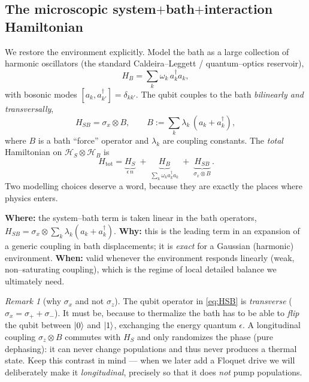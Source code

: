 \documentclass[11pt,a4paper]{article}
\newcommand{\calH}{\mathcal{H}}
\theoremstyle{definition}
\theoremstyle{remark}
\newtheorem{remark}{Remark}[section]
\begin{document}
\subsection{The microscopic system$+$bath$+$interaction Hamiltonian}
We restore the environment explicitly. Model the bath as a large
collection of harmonic oscillators (the standard Caldeira--Leggett /
quantum--optics reservoir),
\begin{equation}
H_B = \sum_k \omega_k\, a_k^\dagger a_k ,
\label{eq:HB}
\end{equation}
with bosonic modes $[a_k,a_{k'}^\dagger]=\delta_{kk'}$. The qubit couples
to the bath \emph{bilinearly and transversally},
\begin{equation}
H_{SB} = \sigma_x \otimes B, \qquad
B := \sum_k \lambda_k\,(a_k + a_k^\dagger),
\label{eq:HSB}
\end{equation}
where $B$ is a bath ``force'' operator and $\lambda_k$ are coupling
constants. The \emph{total} Hamiltonian on $\calH_S\otimes\calH_B$ is
\begin{equation}
\boxed{\,H_{\mathrm{tot}} = \underbrace{H_S}_{\epsilon\, n}
\;+\; \underbrace{H_B}_{\sum_k\omega_k a_k^\dagger a_k}
\;+\; \underbrace{H_{SB}}_{\sigma_x\otimes B}\, .}
\label{eq:Htot-open}
\end{equation}
Two modelling choices deserve a word, because they are exactly the
places where physics enters.

\begin{approxbox}
\textbf{Where:} the system--bath term is taken linear in the bath
operators, $H_{SB}=\sigma_x\otimes\sum_k\lambda_k(a_k+a_k^\dagger)$.
\textbf{Why:} this is the leading term in an expansion of a generic
coupling in bath displacements; it is \emph{exact} for a Gaussian
(harmonic) environment. \textbf{When:} valid whenever the environment
responds linearly (weak, non--saturating coupling), which is the regime
of local detailed balance we ultimately need.
\end{approxbox}

\begin{remark}[why $\sigma_x$ and not $\sigma_z$]
The qubit operator in \eqref{eq:HSB} is \emph{transverse}
($\sigma_x=\sigma_++\sigma_-$). It must be, because to thermalize the
bath has to be able to \emph{flip} the qubit between $\ket{0}$ and
$\ket{1}$, exchanging the energy quantum $\epsilon$. A longitudinal
coupling $\sigma_z\otimes B$ commutes with $H_S$ and only randomizes the
phase (pure dephasing): it can never change populations and thus never
produces a thermal state. Keep this contrast in mind --- when we later
add a Floquet drive we will deliberately make it \emph{longitudinal},
precisely so that it does \emph{not} pump populations.
\end{remark}
\end{document}
